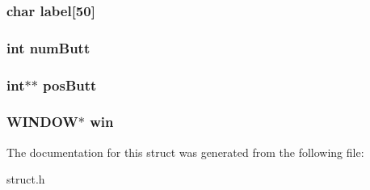 \subsubsection[{\texorpdfstring{label}{label}}]{\setlength{\rightskip}{0pt plus 5cm}char label\mbox{[}50\mbox{]}}\hypertarget{struct___win_a80059d6954dd5c12e38fd5cafe1a16cc}{}\label{struct___win_a80059d6954dd5c12e38fd5cafe1a16cc}
\subsubsection[{\texorpdfstring{num\+Butt}{numButt}}]{\setlength{\rightskip}{0pt plus 5cm}int num\+Butt}\hypertarget{struct___win_a1910eef8db510628192f27b24cdd0eb2}{}\label{struct___win_a1910eef8db510628192f27b24cdd0eb2}
\subsubsection[{\texorpdfstring{pos\+Butt}{posButt}}]{\setlength{\rightskip}{0pt plus 5cm}int$\ast$$\ast$ pos\+Butt}\hypertarget{struct___win_a6d6060115df541c075d8f529a1511d26}{}\label{struct___win_a6d6060115df541c075d8f529a1511d26}
\subsubsection[{\texorpdfstring{win}{win}}]{\setlength{\rightskip}{0pt plus 5cm}W\+I\+N\+D\+OW$\ast$ win}\hypertarget{struct___win_a09d962b38c0d24e36078d717d2a6ed96}{}\label{struct___win_a09d962b38c0d24e36078d717d2a6ed96}


The documentation for this struct was generated from the following file\+:\begin{DoxyCompactItemize}
\item 
struct.\+h\end{DoxyCompactItemize}
